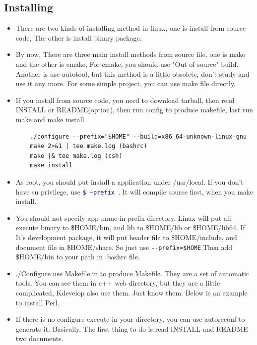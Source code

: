 \documentclass[a4paper,12pt,twoside]{book}
\newcommand{\linuxcommand}[1]{\texttt{\textcolor{blue}{\$ #1 \Pisymbol{psy}{191}}}}
\begin{document}
\subsection{Installing}
\begin{itemize}
		\item There are two kinds of installing method in linux, one is install from source code, The other is install binary package.

		\item By now, There are three main install methods from source file, one is make and the other is cmake, For cmake, you should use "Out of source" build. Another is use autotool, but this method is a little obsolete, don't study and use it any more. For some simple project, you can use make file directly. 

		\item If you install from source code, you need to download tarball, then read INSTALL or README(option), then run config to produce makefile, last run make and make install.
\begin{verbatim}
	./configure --prefix="$HOME" --build=x86_64-unknown-linux-gnu 
	make 2>&1 | tee make.log (bashrc)
	make |& tee make.log (csh)
	make install 
\end{verbatim}

     \item As root, you should put install a application under /usr/local. If you don't have su privilege, use \linuxcommand{--prefix}.  It will compile source first, when you make install.

	 \item You should not specify app name in prefix directory. Linux will put all execute binary to \$HOME/bin, and lib to \$HOME/lib or \$HOME/lib64. If It's development package, it will put header file to \$HOME/include, and document file in \$HOME/share. So just use \verb!--prefix=$HOME!.Then add \$HOME/bin to your path in .bashrc file.  
	
	 \item./Configure use Makefile.in to produce Makefile. They are a set of automatic tools. You can see them in c++ web directory, but they are a little complicated, Kdevelop also use them.  Just know them.  Below is an example to install Perl.

	 \item If there is no configure execute in your directory, you can use autoreconf to generate it. Basically, The first thing to do is read INSTALL and README two documents. 


\end{itemize}
\end{document}
